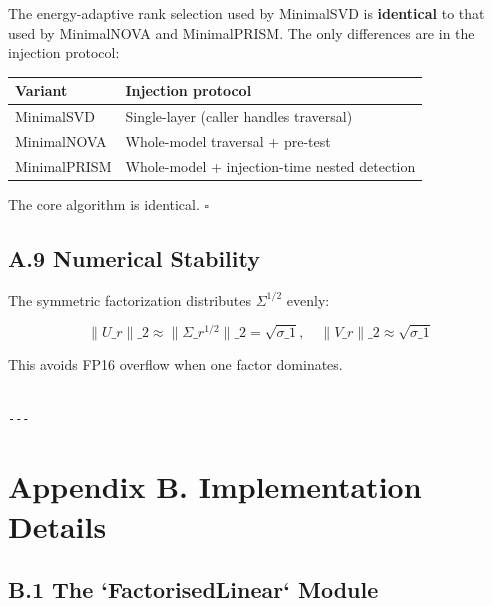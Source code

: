 The energy-adaptive rank selection used by MinimalSVD is \textbf{identical} to 
that used by MinimalNOVA and MinimalPRISM. The only differences are in the 
injection protocol:

\begin{table}[H]
\centering
\small
\begin{tabular}{ll}
\toprule
\textbf{Variant} & \textbf{Injection protocol} \\
\midrule
MinimalSVD & Single-layer (caller handles traversal) \\
MinimalNOVA & Whole-model traversal + pre-test \\
MinimalPRISM & Whole-model + injection-time nested detection \\
\bottomrule
\end{tabular}
\end{table}

The core algorithm is identical. $\square$

\subsection{A.9 Numerical Stability}

The symmetric factorization distributes $\Sigma^{1/2}$ evenly:

\[
\|U\_r\|\_2 \approx \|\Sigma\_r^{1/2}\|\_2 = \sqrt{\sigma\_1}, \quad
\|V\_r\|\_2 \approx \sqrt{\sigma\_1}
\tag{A.5}
\]

This avoids FP16 overflow when one factor dominates.
\begin{lstlisting}

---
\end{lstlisting}


\section{Appendix B. Implementation Details}

\subsection{B.1 The `FactorisedLinear` Module}


